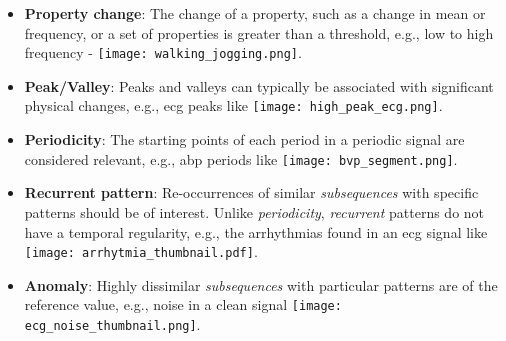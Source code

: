 \begin{itemize}
  \item \textbf{Property change}: The change of a property, such as a change in mean or frequency, or a set of properties is greater than a threshold, e.g., \textcolor{myblue}{low} to \textcolor{mygreen}{high} frequency - \texttt{[image: walking\_jogging.png]}.
  \item \textbf{Peak/Valley}: Peaks and valleys can typically be associated with significant physical changes, e.g., \gls{ecg} \textcolor{mygreen2}{peaks} like \texttt{[image: high\_peak\_ecg.png]}.
  \item \textbf{Periodicity}: The starting points of each period in a periodic signal are considered relevant, e.g., \gls{abp} periods like \texttt{[image: bvp\_segment.png]}.
  \item \textbf{Recurrent pattern}: Re-occurrences of similar \textit{subsequences} with specific patterns should be of interest. Unlike \textit{periodicity}, \textit{recurrent} patterns do not have a temporal regularity, e.g., the \textcolor{myblue}{arrhythmias} found in an \gls{ecg} signal like \texttt{[image: arrhytmia\_thumbnail.pdf]}.
  \item \textbf{Anomaly}: Highly dissimilar \textit{subsequences} with particular patterns are of the reference value, e.g., \textcolor{myred}{noise} in a clean signal \texttt{[image: ecg\_noise\_thumbnail.png]}.
\end{itemize}

